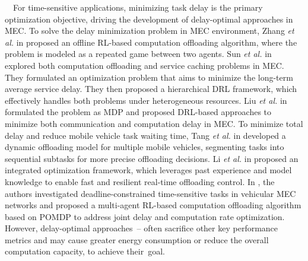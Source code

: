 \documentclass[12pt,draftclsnofoot,onecolumn]{IEEEtran}
\newenvironment{my}[2]%
{\begin{list}{}%
{\setlength{\rightmargin}{#1}\setlength{\leftmargin}{#2}}%


 \item[]{}

} {\end{list}}
\begin{document}
\begin{enumerate}
\begin{my}{1cm}{1cm}
{		\,\,\,\,
		For time-sensitive applications, minimizing task delay is the primary optimization objective, driving the development of delay-optimal approaches in MEC. 
		To solve the delay minimization problem in MEC environment, Zhang \textit{et al.} in \cite{zhang2023offline} proposed an offline RL-based computation offloading algorithm, where the problem is modeled as a repeated game between two agents.
		Sun \textit{et al.} in \cite{sun2024hierarchical} explored both computation offloading and service caching problems in MEC. They formulated an optimization problem that aims to minimize the long-term average service delay. They then proposed a hierarchical DRL framework, which effectively handles both problems under heterogeneous resources. Liu \textit{et al.} in \cite{liu2022deep} formulated the problem as MDP and proposed DRL-based approaches to minimize both communication and computation delay in MEC.
		To minimize total delay and reduce mobile vehicle task waiting time, Tang \textit{et al.} in \cite{tang2022double} developed a dynamic offloading model for multiple mobile vehicles, segmenting tasks into sequential subtasks for more precise offloading decisions.
		Li \textit{et al.} in \cite{li2022integrated} proposed an integrated optimization framework, which leverages past experience and model knowledge to enable fast and resilient real-time offloading control. 
		In \cite{wei2023many}, the authors investigated deadline-constrained time-sensitive tasks in vehicular MEC networks and proposed a multi-agent RL-based computation offloading algorithm based on POMDP to address joint delay and computation rate optimization. However, delay-optimal approaches~\cite{zhang2023offline}--\cite{wei2023many} often sacrifice other key performance metrics and may cause greater energy consumption or reduce the overall computation capacity, to achieve their~goal. \vspace{2mm}
		
}
\end{my}
\end{enumerate}
\end{document}
